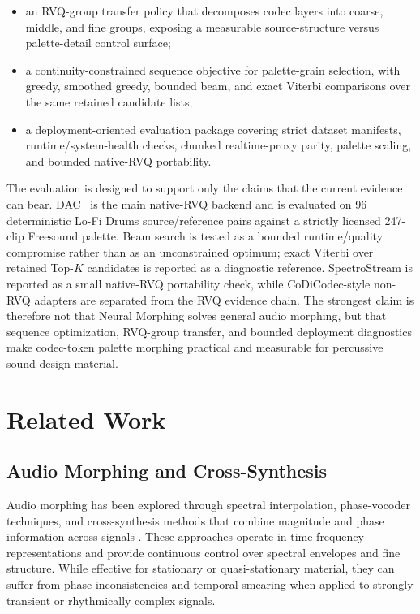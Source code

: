 \documentclass[twoside,a4paper]{article}
\begin{document}
\begin{itemize}
    \item an RVQ-group transfer policy that decomposes codec layers into coarse, middle, and fine groups, exposing a measurable source-structure versus palette-detail control surface;
    \item a continuity-constrained sequence objective for palette-grain selection, with greedy, smoothed greedy, bounded beam, and exact Viterbi comparisons over the same retained candidate lists;
    \item a deployment-oriented evaluation package covering strict dataset manifests, runtime/system-health checks, chunked realtime-proxy parity, palette scaling, and bounded native-RVQ portability.
\end{itemize}

The evaluation is designed to support only the claims that the current evidence can bear. DAC~\cite{Kumar:2023:DAC} is the main native-RVQ backend and is evaluated on 96 deterministic Lo-Fi Drums source/reference pairs against a strictly licensed 247-clip Freesound palette. Beam search is tested as a bounded runtime/quality compromise rather than as an unconstrained optimum; exact Viterbi over retained Top-$K$ candidates is reported as a diagnostic reference. SpectroStream is reported as a small native-RVQ portability check, while CoDiCodec-style non-RVQ adapters are separated from the RVQ evidence chain. The strongest claim is therefore not that Neural Morphing solves general audio morphing, but that sequence optimization, RVQ-group transfer, and bounded deployment diagnostics make codec-token palette morphing practical and measurable for percussive sound-design material.


\section{Related Work}

\subsection{Audio Morphing and Cross-Synthesis}

Audio morphing has been explored through spectral interpolation, phase-vocoder techniques, and cross-synthesis methods that combine magnitude and phase information across signals \cite{Serra:1990:SpectralInterpolation}. These approaches operate in time-frequency representations and provide continuous control over spectral envelopes and fine structure. While effective for stationary or quasi-stationary material, they can suffer from phase inconsistencies and temporal smearing when applied to strongly transient or rhythmically complex signals.
\end{document}

